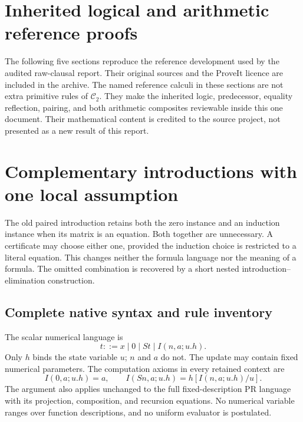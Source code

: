 \documentclass[11pt,letterpaper]{article}
\theoremstyle{definition}
\newcommand{\Cred}{\mathcal C_2}
\begin{document}
\clearpage
\appendix
\section*{Inherited logical and arithmetic reference proofs}
The following five sections reproduce the reference development
used by the audited raw-clausal report. Their original sources
and the ProveIt licence are included in the archive. The named
reference calculi in these sections are not extra primitive rules
of $\Cred$. They make the inherited logic, predecessor, equality
reflection, pairing, and both arithmetic composites reviewable
inside this one document. Their mathematical content is credited
to the source project, not presented as a new result of this report.



\section{Complementary introductions with one local assumption}
\label{sec:choice-introduction}

The old paired introduction retains both the zero instance and an
induction instance when its matrix is an equation. Both together are
unnecessary. A certificate may choose either one, provided the induction
choice is restricted to a literal equation. This changes neither the
formula language nor the meaning of a formula. The omitted combination
is recovered by a short nested introduction--elimination construction.

\subsection{Complete native syntax and rule inventory}

The scalar numerical language is
\[
 t::=x\mid0\mid St\mid I(n,a;u.h).
\]
Only $h$ binds the state variable $u$; $n$ and $a$ do not.
The update may contain fixed numerical parameters. The computation
axioms in every retained context are
\[
 I(0,a;u.h)=a,\qquad
 I(Sn,a;u.h)=h[I(n,a;u.h)/u].
 \tag{I0, IS}\label{eq:choice-computations}
\]
The argument also applies unchanged to the full fixed-description PR
language with its projection, composition, and recursion equations.
No numerical variable ranges over function descriptions, and no uniform
evaluator is postulated.
\end{document}
